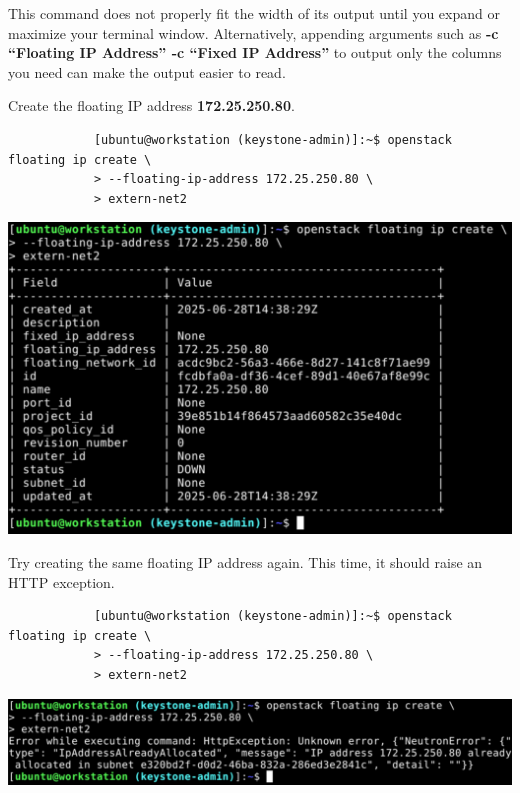 \documentclass[letterpaper, 12pt]{article}
\begin{document}
\begin{enumerate}
    \begin{tipbox}
        This command does not properly fit the width of its output until you expand or maximize your terminal window.
        Alternatively, appending arguments such as \textbf{-c ``Floating IP Address'' -c ``Fixed IP Address''} to output only the columns you need can make the output easier to read. %
    \end{tipbox}

    \begin{labstep}
        Create the floating IP address \textbf{172.25.250.80}.
        \begin{lstlisting}
            [ubuntu@workstation (keystone-admin)]:~$ openstack floating ip create \
            > --floating-ip-address 172.25.250.80 \
            > extern-net2
        \end{lstlisting}

        \begin{center}
            \includegraphics[scale=0.5]{images/part3/step16.png}
        \end{center}
    \end{labstep}

    \begin{labstep}
        Try creating the same floating IP address again.
        This time, it should raise an HTTP exception.
        \begin{lstlisting}
            [ubuntu@workstation (keystone-admin)]:~$ openstack floating ip create \
            > --floating-ip-address 172.25.250.80 \
            > extern-net2
        \end{lstlisting}

        \begin{center}
            \includegraphics[width=\linewidth]{images/part3/step17.png}
        \end{center}
    \end{labstep}


\end{enumerate}
\end{document}

